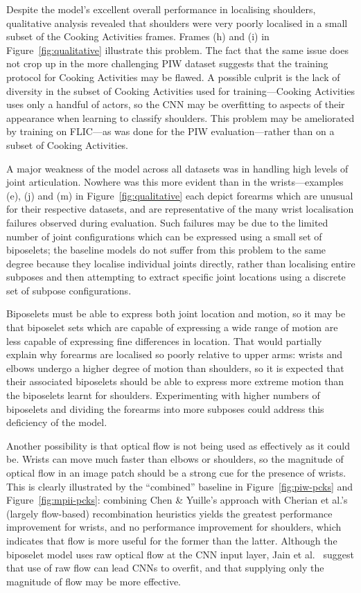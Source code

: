 \documentclass[runningheads]{llncs}
\begin{document}
Despite the model's excellent overall performance in localising shoulders,
qualitative analysis revealed that shoulders were very poorly localised in a
small subset of the Cooking Activities frames. Frames (h) and (i) in
Figure~\ref{fig:qualitative} illustrate this problem. The fact that the same
issue does not crop up in the more challenging PIW dataset suggests that the
training protocol for Cooking Activities may be flawed. A possible culprit is
the lack of diversity in the subset of Cooking Activities used for
training---Cooking Activities uses only a handful of actors, so the CNN may be
overfitting to aspects of their appearance when learning to classify shoulders.
This problem may be ameliorated by training on FLIC---as was done for the PIW
evaluation---rather than on a subset of Cooking Activities.

A major weakness of the model across all datasets was in handling high levels of
joint articulation. Nowhere was this more evident than in the wrists---examples
(e), (j) and (m) in Figure~\ref{fig:qualitative} each depict forearms which are
unusual for their respective datasets, and are representative of the many wrist
localisation failures observed during evaluation. Such failures may be due to
the limited number of joint configurations which can be expressed using a small
set of biposelets; the baseline models do not suffer from this problem to the
same degree because they localise individual joints directly, rather than
localising entire subposes and then attempting to extract specific joint
locations using a discrete set of subpose configurations.

Biposelets must be able to express both joint location and motion, so it may be
that biposelet sets which are capable of expressing a wide range of motion are
less capable of expressing fine differences in location. That would partially
explain why forearms are localised so poorly relative to upper arms: wrists and
elbows undergo a higher degree of motion than shoulders, so it is expected that
their associated biposelets should be able to express more extreme motion than
the biposelets learnt for shoulders. Experimenting with higher numbers of
biposelets and dividing the forearms into more subposes could address this
deficiency of the model.

Another possibility is that optical flow is not being used as effectively as it
could be. Wrists can move much faster than elbows or shoulders, so the magnitude
of optical flow in an image patch should be a strong cue for the presence of
wrists. This is clearly illustrated by the ``combined'' baseline in
Figure~\ref{fig:piw-pcks} and Figure~\ref{fig:mpii-pcks}: combining Chen \&
Yuille's approach with Cherian et al.'s (largely flow-based) recombination
heuristics yields the greatest performance improvement for wrists, and no
performance improvement for shoulders, which indicates that flow is more useful
for the former than the latter. Although the biposelet model uses raw optical
flow at the CNN input layer, Jain et al.~\cite{jain2014modeep} suggest that use
of raw flow can lead CNNs to overfit, and that supplying only the magnitude of
flow may be more effective.
\end{document}
